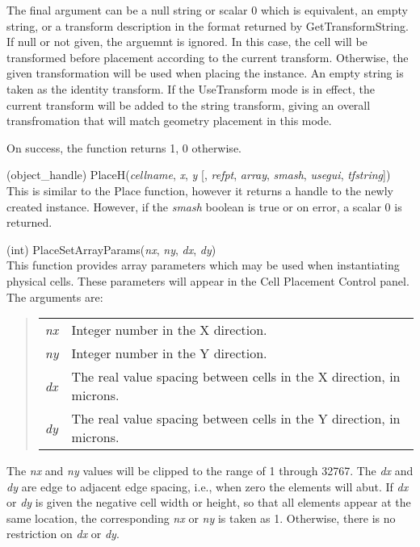 \begin{description}
The final argument can be a null string or scalar 0 which is
equivalent, an empty string, or a transform description in the format
returned by {\vt GetTransformString}.  If null or not given, the
arguemnt is ignored.  In this case, the cell will be transformed
before placement according to the current transform.  Otherwise, the
given transformation will be used when placing the instance.  An empty
string is taken as the identity transform.  If the {\vt UseTransform}
mode is in effect, the current transform will be added to the string
transform, giving an overall transfromation that will match geometry
placement in this mode.

On success, the function returns 1, 0 otherwise.

\item{(object\_handle) \vt PlaceH({\it cellname\/}, {\it x\/}, {\it y\/}
  [, {\it refpt\/}, {\it array\/}, {\it smash\/}, {\it usegui\/},
  {\it tfstring\/}])}\\
This is similar to the {\vt Place} function, however it returns a
handle to the newly created instance.  However, if the {\it smash}
boolean is true or on error, a scalar 0 is returned.

\item{(int) \vt PlaceSetArrayParams({\it nx\/}, {\it ny\/}, {\it dx\/},
{\it dy\/})}\\
This function provides array parameters which may be used when
instantiating physical cells.  These parameters will appear in the
{\cb Cell Placement Control} panel.  The arguments are:
  
\begin{quote}
\begin{tabular}{ll}
{\it nx\/} & Integer number in the X direction.\\
{\it ny\/} & Integer number in the Y direction.\\
{\it dx\/} & The real value spacing between cells in
  the X direction, in microns.\\
{\it dy\/} & The real value spacing between cells in
  the Y direction, in microns.\\
\end{tabular}
\end{quote}
  
The {\it nx} and {\it ny} values will be clipped to the range of 1
through 32767.  The {\it dx} and {\it dy} are edge to adjacent edge
spacing, i.e., when zero the elements will abut.  If {\it dx} or {\it
dy} is given the negative cell width or height, so that all elements
appear at the same location, the corresponding {\it nx} or {\it ny} is
taken as 1.  Otherwise, there is no restriction on {\it dx} or {\it
dy}.


\end{description}
